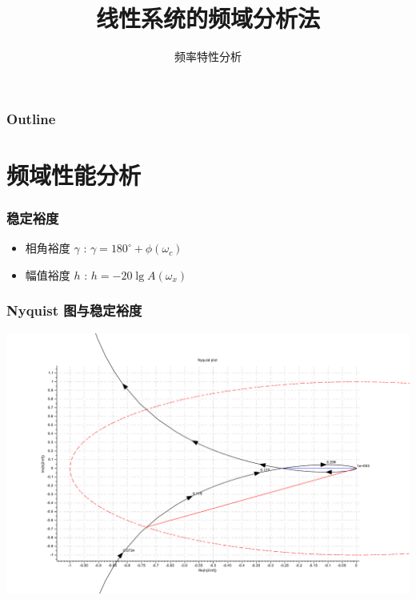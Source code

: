\documentclass[table]{beamer}
\subtitle{频率特性分析}
\title{线性系统的频域分析法}
\author{}
\date{}
\begin{document}
\maketitle

\begin{frame}
\frametitle{Outline}
\setcounter{tocdepth}{3}
\tableofcontents
\end{frame}













\section{频域性能分析}
\label{sec-1}
\begin{frame}
\frametitle{稳定裕度}
\label{sec-1-1}

\begin{itemize}
\item 相角裕度 $\gamma$ : $\gamma=180^{\circ}+\phi(\omega_c)$
\item 幅值裕度 $h$ : $h=-20\lg A(\omega_x)$
\end{itemize}
\end{frame}
\begin{frame}
\frametitle{Nyquist 图与稳定裕度}
\label{sec-1-2}

\includegraphics[width=.9\linewidth]{image/margin_nyquist_scilab.pdf}
\end{frame}
\end{document}
